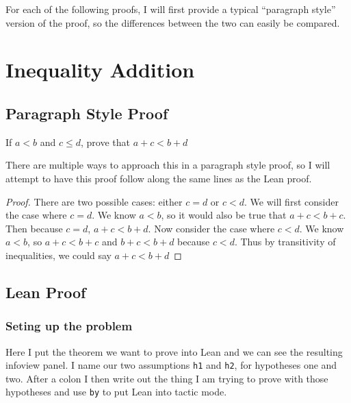 \documentclass[
  letterpaper,
]{scrreprt}
\newcommand{\excl}[1]{}
\theoremstyle{remark}
\begin{document}
For each of the following proofs, I will first provide a typical
``paragraph style'' version of the proof, so the differences between the
two can easily be compared.

\hypertarget{inequality-addition}{%
\section{Inequality Addition}\label{inequality-addition}}

\hypertarget{paragraph-style-proof}{%
\subsection{Paragraph Style Proof}\label{paragraph-style-proof}}

\begin{thm}
If \(a < b\) and \(c \le d\), prove that \(a + c < b + d\)

\end{thm}

There are multiple ways to approach this in a paragraph style proof, so
I will attempt to have this proof follow along the same lines as the
Lean proof.

\begin{proof}

There are two possible cases: either \(c = d\) or \(c < d\). We will
first consider the case where \(c = d\). We know \(a < b\), so it would
also be true that \(a + c < b + c\). Then because \(c = d\),
\(a + c < b + d\). Now consider the case where \(c < d\). We know
\(a < b\), so \(a + c < b + c\) and \(b + c < b + d\) because \(c < d\).
Thus by transitivity of inequalities, we could say \(a + c < b + d\)
\excl{~□}\qedhere

\end{proof}

\hypertarget{lean-proof}{%
\subsection{Lean Proof}\label{lean-proof}}

\hypertarget{seting-up-the-problem}{%
\subsubsection{Seting up the problem}\label{seting-up-the-problem}}

Here I put the theorem we want to prove into Lean and we can see the
resulting infoview panel. I name our two assumptions \texttt{h1} and
\texttt{h2}, for hypotheses one and two. After a colon I then write out
the thing I am trying to prove with those hypotheses and use \texttt{by}
to put Lean into tactic mode.
\end{document}
